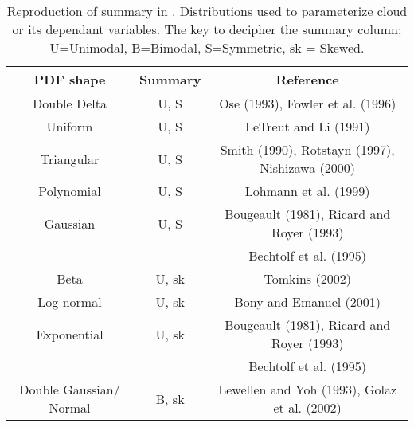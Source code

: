 \begin{table}[ht]
    \centering
    \setlength\tabcolsep{1.5pt} %
    \setlength\extrarowheight{-7pt}
    \begin{tabular}{c|c|c}
        PDF shape &  Summary & Reference \\ \hline
        Double Delta & U, S & Ose (1993), Fowler et al. (1996) \\
        Uniform & U, S & LeTreut and Li (1991) \\
        Triangular & U, S & Smith (1990), Rotstayn (1997), Nishizawa (2000) \\
        Polynomial & U, S & Lohmann et al. (1999) \\
        Gaussian & U, S & Bougeault (1981), Ricard and Royer (1993) \\ 
        & &  Bechtolf et al. (1995) \\
        Beta & U, sk & Tomkins (2002) \\
        Log-normal & U, sk & Bony and Emanuel (2001) \\ 
        Exponential &  U, sk & Bougeault (1981), Ricard and Royer (1993) \\
        & &  Bechtolf et al. (1995) \\
        Double Gaussian/ Normal & B, sk & Lewellen and Yoh (1993), Golaz et al. (2002)
    \end{tabular}
    \caption{Reproduction of summary in \cite{Tompkins2009CloudParametrization}. Distributions used to parameterize cloud or its dependant variables. The key to decipher the summary column; U=Unimodal, B=Bimodal, S=Symmetric, sk = Skewed.}
    \label{tab:summary_PDF}
\end{table}
